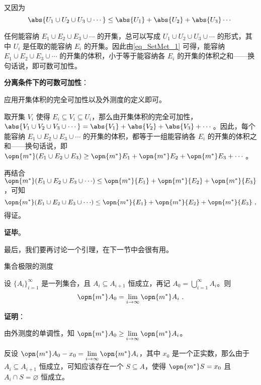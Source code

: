 又因为
\begin{equation}\label{eq_SetMet_1}
\abs{U_1\cup U_2\cup U_3\cup \cdots} \leq \abs{U_1}+\abs{U_2}+\abs{U_3}\cdots~
\end{equation}

任何能容纳 $E_1\cup E_2\cup E_3\cup \cdots $ 的开集，总可以写成 $U_1\cup U_2\cup U_3\cup \cdots$ 的形式，其中 $U_i$ 是任取的能容纳 $E_i$ 的开集。因此由\autoref{eq_SetMet_1} 可得，能容纳 $E_1\cup E_2\cup E_3\cup \cdots $ 的开集的体积，小于等于能容纳各 $E_i$ 的开集的体积之和——换句话说，即可数可加性。

\textbf{分离条件下的可数可加性}：

应用开集体积的完全可加性以及外测度的定义即可。

取开集 $V_i$ 使得 $E_i\subseteq V_i\subseteq U_i$，那么由开集体积的完全可加性，$\abs{V_1\cup V_2\cup V_3\cup \cdots}=\abs{V_1}+\abs{V_2}+\abs{V_3}+\cdots$。因此，每个能容纳 $E_1\cup E_2\cup E_3\cup\cdots$ 的开集的体积，都等于一组能容纳各 $E_i$ 的开集的体积之和——换句话说，即 $\opn{m^*}(E_1\cup E_2\cup E_3)\geq\opn{m^*}E_1+\opn{m^*}E_2+\opn{m^*}E_3+\cdots$。

再结合 $\opn{m^*}({E_1\cup E_2\cup E_3\cup \cdots})\leq \opn{m^*}{E_1}+\opn{m^*}{E_2}+\opn{m^*}{E_3}$，可知
\begin{equation}
\opn{m^*}({E_1\cup E_2\cup E_3\cup \cdots})\leq \opn{m^*}{E_1}+\opn{m^*}{E_2}+\opn{m^*}{E_3}~,
\end{equation}
得证。

\textbf{证毕}。

最后，我们要再讨论一个引理，在下一节中会很有用。

\begin{lemma}{集合极限的测度}\label{lem_SetMet_1}

设 $\{A_i\}_{i=1}^\infty$ 是一列集合，且 $A_{i}\subseteq A_{i+1}$ 恒成立，再记 $A_0=\bigcup_{i=1}^\infty A_i$。则
\begin{equation}
\opn{m^*}A_0=\lim\limits_{i\to\infty}\opn{m^*}A_i~.
\end{equation}

\end{lemma}


\textbf{证明}：

由外测度的单调性，知 $\opn{m^*}A_0\geq\lim\limits_{i\to\infty}\opn{m^*}A_i$。

反设 $\opn{m^*}A_0-x_0=\lim\limits_{i\to\infty}\opn{m^*}A_i$，其中 $x_0$ 是一个正实数，那么由于 $A_{i}\subseteq A_{i+1}$ 恒成立，可知应该存在一个 $S\subseteq A$，使得 $\opn{m^*}S=x_0$ 且 $A_i\cap S=\varnothing$ 恒成立。

